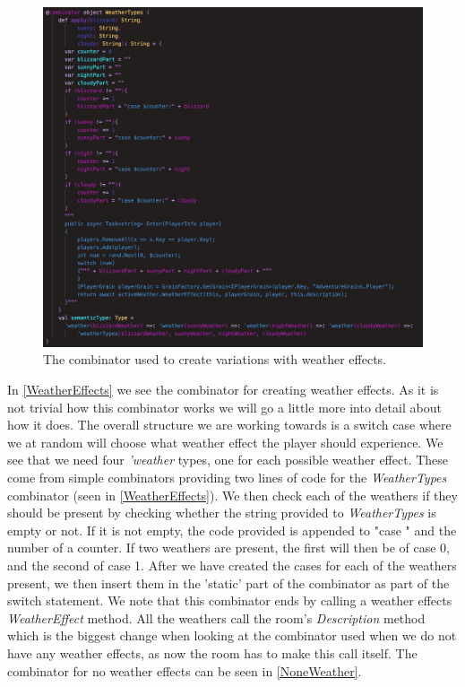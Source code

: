 \begin{figure}[H]
	\centering
	\includegraphics[width=\linewidth]{Materials/Decomposition/Room/WeatherEffects}
	\caption{The combinator used to create variations with weather effects.}
	\label{WeatherEffects}
\end{figure}
In \autoref{WeatherEffects} we see the combinator for creating weather effects. As it is not trivial how this combinator works we will go a little more into detail about how it does. The overall structure we are working towards is a switch case where we at random will choose what weather effect the player should experience. We see that we need four \textit{'weather} types, one for each possible weather effect. These come from simple combinators providing two lines of code for the \textit{WeatherTypes} combinator (seen in \autoref{WeatherEffects}). We then check each of the weathers if they should be present by checking whether the string provided to \textit{WeatherTypes} is empty or not. If it is not empty, the code provided is appended to "case " and the number of a counter. If two weathers are present, the first will then be of case 0, and the second of case 1. After we have created the cases for each of the weathers present, we then insert them in the 'static' part of the combinator as part of the switch statement. We note that this combinator ends by calling a weather effects \textit{WeatherEffect} method. All the weathers call the room's \textit{Description} method which is the biggest change when looking at the combinator used when we do not have any weather effects, as now the room has to make this call itself. The combinator for no weather effects can be seen in \autoref{NoneWeather}.


